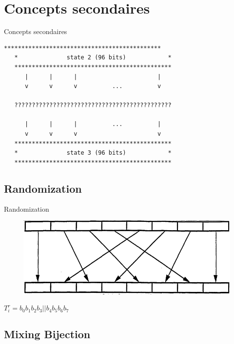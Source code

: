 \documentclass{beamer}
\begin{document}
\section{Concepts secondaires}

\begin{frame}[fragile]{Concepts secondaires}
\begin{Verbatim}[samepage=true]
   *********************************************
   *              state 2 (96 bits)            *
   *********************************************
      |      |      |                       |
      v      v      v          ...          v
 
   ?????????????????????????????????????????????
 
      |      |      |          ...          |
      v      v      v                       v
   *********************************************
   *              state 3 (96 bits)            *
   *********************************************
\end{Verbatim}
\end{frame}

\subsection{Randomization}

\begin{frame}{Randomization}
  \begin{figure}[h]
    \centering
    \includegraphics[scale=0.4]{./images/randomization.png}
  \end{figure}
  
  \begin{center}
$T_i^r = b_0 b_1 b_2 b_3||b_4 b_5 b_6 b_7$
\end{center}
\end{frame}

\subsection{Mixing Bijection}
\end{document}
